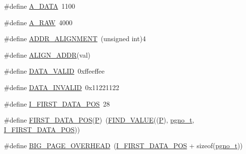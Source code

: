 \begin{DoxyCompactItemize}
\item 
\#define \mbox{\hyperlink{adat-devel_2other__libs_2filedb_2filehash_2ffdb__page_8h_a1e9a072d99b3a8fd755ce6283bc61018}{A\+\_\+\+D\+A\+TA}}~1100
\item 
\#define \mbox{\hyperlink{adat-devel_2other__libs_2filedb_2filehash_2ffdb__page_8h_afa7f4ab9a2e695d7e401c22aaf26e29c}{A\+\_\+\+R\+AW}}~4000
\item 
\#define \mbox{\hyperlink{adat-devel_2other__libs_2filedb_2filehash_2ffdb__page_8h_ac23c141353b587a1625319997c5fc3af}{A\+D\+D\+R\+\_\+\+A\+L\+I\+G\+N\+M\+E\+NT}}~(unsigned int)4
\item 
\#define \mbox{\hyperlink{adat-devel_2other__libs_2filedb_2filehash_2ffdb__page_8h_ae6aa7c5da88d670042d36bf87ec227f2}{A\+L\+I\+G\+N\+\_\+\+A\+D\+DR}}(val)
\item 
\#define \mbox{\hyperlink{adat-devel_2other__libs_2filedb_2filehash_2ffdb__page_8h_aaf28170a8fc3621832a11bed0ca9d4e3}{D\+A\+T\+A\+\_\+\+V\+A\+L\+ID}}~0xffeeffee
\item 
\#define \mbox{\hyperlink{adat-devel_2other__libs_2filedb_2filehash_2ffdb__page_8h_ae4f8131dfd7af7cb4f6b0a3f4d6fc451}{D\+A\+T\+A\+\_\+\+I\+N\+V\+A\+L\+ID}}~0x11221122
\item 
\#define \mbox{\hyperlink{adat-devel_2other__libs_2filedb_2filehash_2ffdb__page_8h_a29cb67ea91528158b0a0e291c481adec}{I\+\_\+\+F\+I\+R\+S\+T\+\_\+\+D\+A\+T\+A\+\_\+\+P\+OS}}~28
\item 
\#define \mbox{\hyperlink{adat-devel_2other__libs_2filedb_2filehash_2ffdb__page_8h_adad1dfd923f34ba368bdc27c8040be12}{F\+I\+R\+S\+T\+\_\+\+D\+A\+T\+A\+\_\+\+P\+OS}}(\mbox{\hyperlink{adat__devel_2lib_2hadron_2operator__name__util_8cc_aef94be98e2c9e4a4dece75f60ca9792c}{P}})~(\mbox{\hyperlink{adat__devel_2other__libs_2filedb_2filehash_2ffdb__page_8h_aac067124fe4d81f5306f4e2131e1121e}{F\+I\+N\+D\+\_\+\+V\+A\+L\+UE}}((\mbox{\hyperlink{adat__devel_2lib_2hadron_2operator__name__util_8cc_aef94be98e2c9e4a4dece75f60ca9792c}{P}}), \mbox{\hyperlink{adat-devel_2other__libs_2filedb_2filehash_2ffdb__db_8h_a000813331643d38481142bcce7de1501}{pgno\+\_\+t}}, \mbox{\hyperlink{adat__devel_2other__libs_2filedb_2filehash_2ffdb__page_8h_a29cb67ea91528158b0a0e291c481adec}{I\+\_\+\+F\+I\+R\+S\+T\+\_\+\+D\+A\+T\+A\+\_\+\+P\+OS}}))
\item 
\#define \mbox{\hyperlink{adat-devel_2other__libs_2filedb_2filehash_2ffdb__page_8h_a68d9afb9ee114439ca6f6c33ff979dde}{B\+I\+G\+\_\+\+P\+A\+G\+E\+\_\+\+O\+V\+E\+R\+H\+E\+AD}}~(\mbox{\hyperlink{adat__devel_2other__libs_2filedb_2filehash_2ffdb__page_8h_a29cb67ea91528158b0a0e291c481adec}{I\+\_\+\+F\+I\+R\+S\+T\+\_\+\+D\+A\+T\+A\+\_\+\+P\+OS}} + sizeof(\mbox{\hyperlink{adat-devel_2other__libs_2filedb_2filehash_2ffdb__db_8h_a000813331643d38481142bcce7de1501}{pgno\+\_\+t}}))

\end{DoxyCompactItemize}
